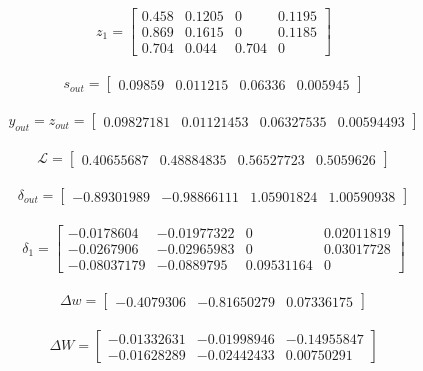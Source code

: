 \documentclass[a4paper]{article}
\begin{document}
\begin{gather}z_1 = \begin{bmatrix} 0.458 & 0.1205 & 0 & 0.1195 \\ 0.869 & 0.1615 & 0 & 0.1185 \\ 0.704 & 0.044 & 0.704 & 0 \end{bmatrix}\nonumber \end{gather}

\begin{gather}s_{out} = \begin{bmatrix} 0.09859 & 0.011215 & 0.06336 & 0.005945 \end{bmatrix}\nonumber \end{gather}

\begin{gather}y_{out} = z_{out} = \begin{bmatrix} 0.09827181 & 0.01121453 & 0.06327535 & 0.00594493 \end{bmatrix}\nonumber \end{gather}

\begin{gather}\mathcal{L} = \begin{bmatrix} 0.40655687 & 0.48884835 & 0.56527723 & 0.5059626 \end{bmatrix}\nonumber \end{gather}

\begin{gather}\delta_{out} = \begin{bmatrix} -0.89301989 & -0.98866111 & 1.05901824 & 1.00590938 \end{bmatrix}\nonumber \end{gather}

\begin{gather}\delta_1 = \begin{bmatrix} -0.0178604  & -0.01977322 & 0 &  0.02011819 \\ -0.0267906 & -0.02965983 & 0 & 0.03017728 \\ -0.08037179 & -0.0889795 & 0.09531164 & 0 \end{bmatrix}\nonumber \end{gather}

\begin{gather}\Delta w = \begin{bmatrix} -0.4079306 & -0.81650279 & 0.07336175 \end{bmatrix}\nonumber \end{gather}

\begin{gather}
\Delta W =
 \begin{bmatrix} -0.01332631 & -0.01998946 & -0.14955847 \\ -0.01628289 & -0.02442433 & 0.00750291 \end{bmatrix}
 \nonumber 
\end{gather}
\end{document}
